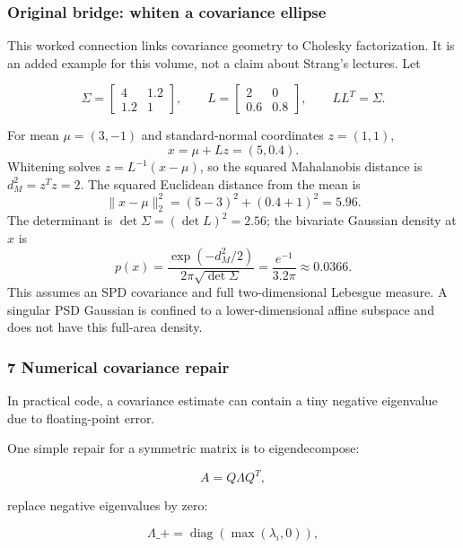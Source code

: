\subsubsection{Original bridge: whiten a covariance ellipse}\label{02-foundations-ii-ch024-original-bridge-whiten-a-covariance-ellipse}

\hypertarget{02-foundations-ii-ch024-original-bridge-whiten-a-covariance-ellipse}{}

This worked connection links covariance geometry to Cholesky factorization. It is an added example for this volume, not a claim about Strang's lectures. Let

\[
\Sigma=\begin{bmatrix}4&1.2\\1.2&1\end{bmatrix},
\qquad
L=\begin{bmatrix}2&0\\0.6&0.8\end{bmatrix},
\qquad
LL^T=\Sigma.
\]

For mean \(\mu=(3,-1)\) and standard-normal coordinates \(z=(1,1)\), \[
x=\mu+Lz=(5,0.4).
\] Whitening solves \(z=L^{-1}(x-\mu)\), so the squared Mahalanobis distance is \(d_M^2=z^Tz=2\). The squared Euclidean distance from the mean is \[
\|x-\mu\|_2^2=(5-3)^2+(0.4+1)^2=5.96.
\] The determinant is \(\det\Sigma=(\det L)^2=2.56\); the bivariate Gaussian density at \(x\) is \[
p(x)=\frac{\exp(-d_M^2/2)}{2\pi\sqrt{\det\Sigma}}=\frac{e^{-1}}{3.2\pi}\approx0.0366.
\] This assumes an SPD covariance and full two-dimensional Lebesgue measure. A singular PSD Gaussian is confined to a lower-dimensional affine subspace and does not have this full-area density.

\subsubsection{7 Numerical covariance repair}\label{02-foundations-ii-ch024-numerical-covariance-repair}

\hypertarget{02-foundations-ii-ch024-numerical-covariance-repair}{}

In practical code, a covariance estimate can contain a tiny negative eigenvalue due to floating-point error.

One simple repair for a symmetric matrix is to eigendecompose:

\[
 A=Q\Lambda Q^T,
\]

replace negative eigenvalues by zero:

\[
 \Lambda\_+= \operatorname{diag}(\max(\lambda_i,0)),
\]

